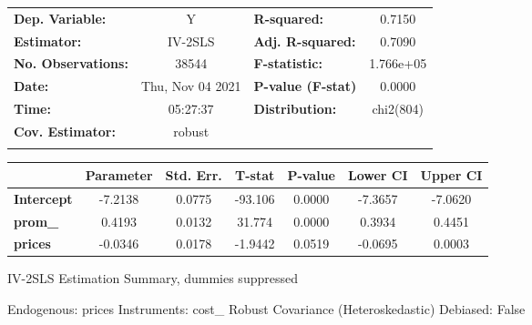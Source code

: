 \begin{center}
\begin{tabular}{lclc}
\toprule
\textbf{Dep. Variable:}                 &         Y          & \textbf{  R-squared:         } &      0.7150      \\
\textbf{Estimator:}                     &      IV-2SLS       & \textbf{  Adj. R-squared:    } &      0.7090      \\
\textbf{No. Observations:}              &       38544        & \textbf{  F-statistic:       } &    1.766e+05     \\
\textbf{Date:}                          &  Thu, Nov 04 2021  & \textbf{  P-value (F-stat)   } &      0.0000      \\
\textbf{Time:}                          &      05:27:37      & \textbf{  Distribution:      } &    chi2(804)     \\
\textbf{Cov. Estimator:}                &       robust       & \textbf{                     } &                  \\
\textbf{}                               &                    & \textbf{                     } &                  \\
\bottomrule
\end{tabular}
\begin{tabular}{lcccccc}
                                        & \textbf{Parameter} & \textbf{Std. Err.} & \textbf{T-stat} & \textbf{P-value} & \textbf{Lower CI} & \textbf{Upper CI}  \\
\midrule
\textbf{Intercept}                      &      -7.2138       &       0.0775       &     -93.106     &      0.0000      &      -7.3657      &      -7.0620       \\
\textbf{prom\_}                         &       0.4193       &       0.0132       &      31.774     &      0.0000      &       0.3934      &       0.4451       \\
\textbf{prices}                         &      -0.0346       &       0.0178       &     -1.9442     &      0.0519      &      -0.0695      &       0.0003       \\
\bottomrule
\end{tabular}
\caption{IV-2SLS Estimation Summary, dummies suppressed }
\end{center}

Endogenous: prices \newline
 Instruments: cost\_ \newline
 Robust Covariance (Heteroskedastic) \newline
 Debiased: False
